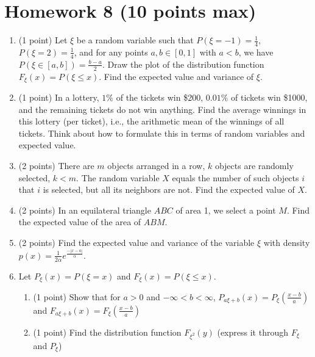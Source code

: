 \documentclass{article}
\begin{document}
\section*{Homework 8 (10 points max)}

\begin{enumerate}
  \item (1 point) Let $\xi$ be a random variable such that 
  $P(\xi = -1) = \frac{1}{4}$, $P(\xi = 2) = \frac{1}{4}$, 
  and for any points $a, b \in [0, 1]$ with $a < b$, 
  we have $P(\xi \in [a, b]) = \frac{b - a}{2}$.
  Draw the plot of the distribution function $F_{\xi}(x) = P(\xi \leq x)$. 
  Find the expected value and variance of $\xi$.

  \item (1 point) In a lottery, $1\%$ of the tickets win \$200, $0.01\%$ 
  of tickets win \$1000, and the remaining tickets do not win anything. 
  Find the average winnings in this lottery (per ticket), 
  i.e., the arithmetic mean of the winnings of all tickets. 
  Think about how to formulate this in terms of random variables 
  and expected value.

  \item (2 points) There are $m$ objects arranged in a row, $k$ objects are 
  randomly selected, $k < m$. The random variable $X$ equals the number 
  of such objects $i$ that $i$ is selected, 
  but all its neighbors are not. Find the expected value of $X$.

  \item (2 points) In an equilateral triangle $ABC$ of area 1, we select a point $M$. 
  Find the expected value of the area of $ABM$.

  \item (2 points) Find the expected value and variance of the variable $\xi$ 
  with density $p(x) = \frac{1}{2\alpha} e^{\frac{-|x-a|}{\alpha}}$.

  \item Let $P_{\xi}(x) = P(\xi = x)$ and $F_{\xi}(x) = P(\xi \leq x)$.
  \begin{enumerate}
      \item (1 point) Show that for $a > 0$ and $-\infty < b < \infty$, 
      $P_{a\xi+b}(x) = P_{\xi}(\frac{x-b}{a})$ and 
      $F_{a\xi+b}(x) = F_{\xi}(\frac{x-b}{a})$
      \item (1 point) Find the distribution function $F_{\xi^2}(y)$ 
      (express it through $F_{\xi}$ and $P_{\xi}$)
  \end{enumerate}
\end{enumerate}
\end{document}
